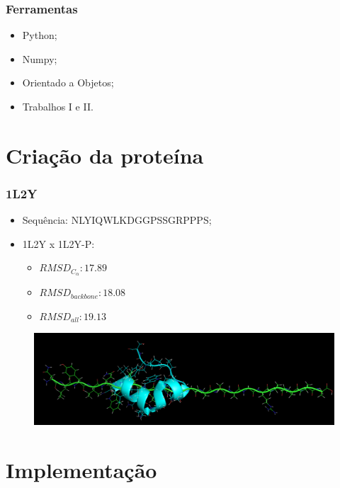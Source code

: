 \documentclass{beamer}
\begin{document}
\begin{frame}
\frametitle{Ferramentas}
\begin{itemize}
\item Python;
\item Numpy;
\item Orientado a Objetos;
\item Trabalhos I e II.
\end{itemize}
\end{frame}

\section{Criação da proteína} %

\begin{frame}
\frametitle{1L2Y}
\begin{itemize}
\item Sequência: NLYIQWLKDGGPSSGRPPPS;
\item 1L2Y x 1L2Y-P:
\begin{itemize}
  \item $RMSD_{C_\alpha}: 17.89$
  \item $RMSD_{backbone}: 18.08$
  \item $RMSD_{all}: 19.13$ 
\end{itemize}
\end{itemize}
\begin{figure}
\includegraphics[width=0.7\linewidth]{1L2Y.png}
\end{figure}
\end{frame}

\section{Implementação} %
\end{document}
